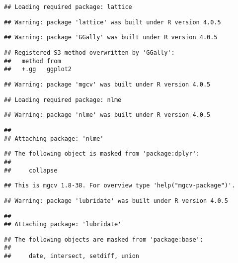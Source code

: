 \documentclass[
]{article}
\begin{document}
\begin{verbatim}
## Loading required package: lattice
\end{verbatim}

\begin{verbatim}
## Warning: package 'lattice' was built under R version 4.0.5
\end{verbatim}

\begin{verbatim}
## Warning: package 'GGally' was built under R version 4.0.5
\end{verbatim}

\begin{verbatim}
## Registered S3 method overwritten by 'GGally':
##   method from   
##   +.gg   ggplot2
\end{verbatim}

\begin{verbatim}
## Warning: package 'mgcv' was built under R version 4.0.5
\end{verbatim}

\begin{verbatim}
## Loading required package: nlme
\end{verbatim}

\begin{verbatim}
## Warning: package 'nlme' was built under R version 4.0.5
\end{verbatim}

\begin{verbatim}
## 
## Attaching package: 'nlme'
\end{verbatim}

\begin{verbatim}
## The following object is masked from 'package:dplyr':
## 
##     collapse
\end{verbatim}

\begin{verbatim}
## This is mgcv 1.8-38. For overview type 'help("mgcv-package")'.
\end{verbatim}

\begin{verbatim}
## Warning: package 'lubridate' was built under R version 4.0.5
\end{verbatim}

\begin{verbatim}
## 
## Attaching package: 'lubridate'
\end{verbatim}

\begin{verbatim}
## The following objects are masked from 'package:base':
## 
##     date, intersect, setdiff, union
\end{verbatim}
\end{document}
